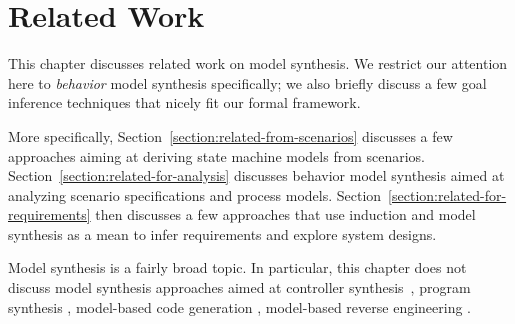 \chapter{Related Work\label{chapter:related-work}}

This chapter discusses related work on model synthesis. We restrict our attention here to \emph{behavior} model synthesis specifically; we also briefly discuss a few goal inference techniques that nicely fit our formal framework. 

More specifically, Section~\ref{section:related-from-scenarios} discusses a few approaches aiming at deriving state machine models from scenarios. Section~\ref{section:related-for-analysis} discusses behavior model synthesis aimed at analyzing scenario specifications and process models. Section~\ref{section:related-for-requirements} then discusses a few approaches that use induction and model synthesis as a mean to infer requirements and explore system designs.

Model synthesis is a fairly broad topic. In particular, this chapter does not discuss model synthesis approaches aimed at controller synthesis~\cite{Clarke:1981, Pnueli:1989, Asarin:1995}, program synthesis \cite{Manna:1971, Balzer:1985, Wasowski:2003}, model-based code generation \cite{Kohler:2000, Wasowski:2003}, model-based reverse engineering \cite{Briand:2003, Yu:2005}.





